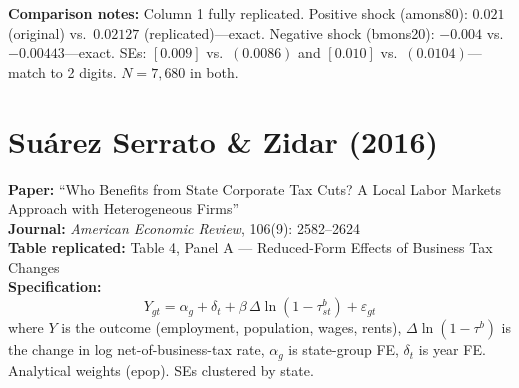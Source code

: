 \documentclass[11pt,a4paper]{article}
\begin{document}
\vspace{1cm}
\textbf{Comparison notes:} Column 1 fully replicated. Positive shock (amons80): $0.021$ (original) vs.\ $0.02127$ (replicated)---exact. Negative shock (bmons20): $-0.004$ vs.\ $-0.00443$---exact. SEs: $[0.009]$ vs.\ $(0.0086)$ and $[0.010]$ vs.\ $(0.0104)$---match to 2 digits. $N = 7{,}680$ in both.

\newpage

\section{Su\'arez Serrato \& Zidar (2016)}

\textbf{Paper:} ``Who Benefits from State Corporate Tax Cuts? A Local Labor Markets Approach with Heterogeneous Firms''\\
\textbf{Journal:} \textit{American Economic Review}, 106(9): 2582--2624\\
\textbf{Table replicated:} Table 4, Panel A --- Reduced-Form Effects of Business Tax Changes\\
\textbf{Specification:}
\[
Y_{gt} = \alpha_g + \delta_t + \beta\,\Delta\ln(1 - \tau^b_{st}) + \varepsilon_{gt}
\]
where $Y$ is the outcome (employment, population, wages, rents), $\Delta\ln(1-\tau^b)$ is the change in log net-of-business-tax rate, $\alpha_g$ is state-group FE, $\delta_t$ is year FE. Analytical weights (epop). SEs clustered by state.

\vspace{0.3cm}
\noindent{}
\end{document}
